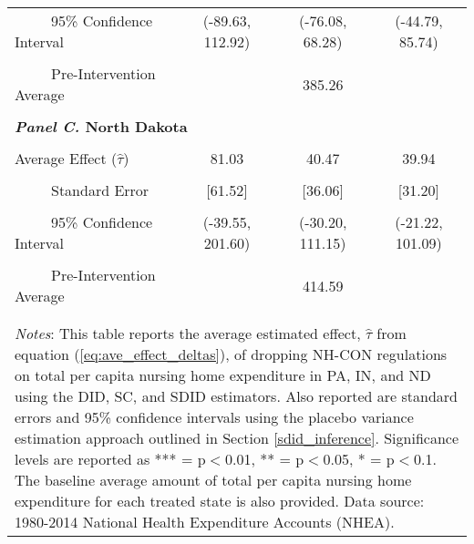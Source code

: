 \documentclass[../Main.tex]{subfiles}
\begin{document}
\begin{table}[htbp]
\begin{tabular}{l*{3}{c}}
\\[-2ex]
\multicolumn{1}{l}{\ \ \ \ \ 95\% Confidence Interval}&   \multicolumn{1}{c}{(-89.63, 112.92)}&   \multicolumn{1}{c}{(-76.08, 68.28)}&   \multicolumn{1}{c}{(-44.79, 85.74)}\\
\\[-2ex]
\multicolumn{1}{l}{\ \ \ \ \ Pre-Intervention Average}&   \multicolumn{3}{c}{385.26}\\
\\[-.1ex]
\multicolumn{4}{l}{\textbf{\textit{Panel C.} North Dakota}}\\
\\[-1.5ex]
\multicolumn{1}{l}{Average Effect ($\hat{\tau}$)}&   \multicolumn{1}{c}{81.03}&   \multicolumn{1}{c}{40.47}&  \multicolumn{1}{c}{39.94}\\
\\[-2ex]
\multicolumn{1}{l}{\ \ \ \ \ Standard Error}  &\multicolumn{1}{c}{[61.52]}&\multicolumn{1}{c}{[36.06]}&\multicolumn{1}{c}{[31.20]}\\
\\[-2ex]
\multicolumn{1}{l}{\ \ \ \ \ 95\% Confidence Interval}&   \multicolumn{1}{c}{(-39.55, 201.60)}&   \multicolumn{1}{c}{(-30.20, 111.15)}&   \multicolumn{1}{c}{(-21.22, 101.09)}\\
\\[-2ex]
\multicolumn{1}{l}{\ \ \ \ \ Pre-Intervention Average}&   \multicolumn{3}{c}{414.59}\\
\\[-.1ex]
\hline\hline
\\[-2ex]
\multicolumn{4}{p{.78\linewidth}}{\footnotesize \textit{Notes}: This table reports the average estimated effect, $\hat{\tau}$ from equation (\ref{eq:ave_effect_deltas}), of dropping NH-CON regulations on total per capita nursing home expenditure in PA, IN, and ND using the DID, SC, and SDID estimators. Also reported are standard errors and 95\% confidence intervals using the placebo variance estimation approach outlined in Section \ref{sdid_inference}. Significance levels are reported as *** = p$<$0.01, ** = p$<$0.05, * = p$<$0.1. The baseline average amount of total per capita nursing home expenditure for each treated state is also provided. Data source: 1980-2014 National Health Expenditure Accounts (NHEA).}
\end{tabular}
\end{table}
\vfill
\clearpage
\end{document}
